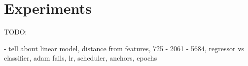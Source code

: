 \section{Experiments}
\label{sec:experiments}

TODO:

- tell about linear model, distance from features,  725 - 2061 - 5684, regressor vs classifier, adam fails, lr, scheduler, anchors, epochs
